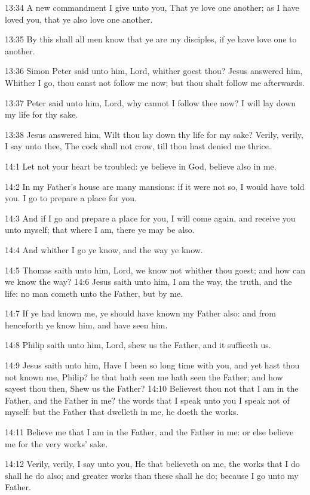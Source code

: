 13:34 A new commandment I give unto you, That ye love one another; as
I have loved you, that ye also love one another.

13:35 By this shall all men know that ye are my disciples, if ye have
love one to another.

13:36 Simon Peter said unto him, Lord, whither goest thou? Jesus
answered him, Whither I go, thou canst not follow me now; but thou
shalt follow me afterwards.

13:37 Peter said unto him, Lord, why cannot I follow thee now? I will
lay down my life for thy sake.

13:38 Jesus answered him, Wilt thou lay down thy life for my sake?
Verily, verily, I say unto thee, The cock shall not crow, till thou
hast denied me thrice.

14:1 Let not your heart be troubled: ye believe in God, believe also
in me.

14:2 In my Father's house are many mansions: if it were not so, I
would have told you. I go to prepare a place for you.

14:3 And if I go and prepare a place for you, I will come again, and
receive you unto myself; that where I am, there ye may be also.

14:4 And whither I go ye know, and the way ye know.

14:5 Thomas saith unto him, Lord, we know not whither thou goest; and
how can we know the way?  14:6 Jesus saith unto him, I am the way, the
truth, and the life: no man cometh unto the Father, but by me.

14:7 If ye had known me, ye should have known my Father also: and from
henceforth ye know him, and have seen him.

14:8 Philip saith unto him, Lord, shew us the Father, and it sufficeth
us.

14:9 Jesus saith unto him, Have I been so long time with you, and yet
hast thou not known me, Philip? he that hath seen me hath seen the
Father; and how sayest thou then, Shew us the Father?  14:10 Believest
thou not that I am in the Father, and the Father in me?  the words
that I speak unto you I speak not of myself: but the Father that
dwelleth in me, he doeth the works.

14:11 Believe me that I am in the Father, and the Father in me: or
else believe me for the very works' sake.

14:12 Verily, verily, I say unto you, He that believeth on me, the
works that I do shall he do also; and greater works than these shall
he do; because I go unto my Father.

